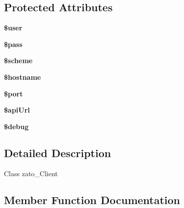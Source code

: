 \subsection*{Protected Attributes}
\begin{DoxyCompactItemize}
\item 
\hypertarget{classzato_1_1_zato_client_a674d21f5f1f85c67108fc5d32270e2e3}{}{\bfseries \$user}\label{classzato_1_1_zato_client_a674d21f5f1f85c67108fc5d32270e2e3}

\item 
\hypertarget{classzato_1_1_zato_client_a6a60705a05ead6f984e5021e6732b679}{}{\bfseries \$pass}\label{classzato_1_1_zato_client_a6a60705a05ead6f984e5021e6732b679}

\item 
\hypertarget{classzato_1_1_zato_client_a23581082511d86f7ff4bfd95a3f7ea38}{}{\bfseries \$scheme}\label{classzato_1_1_zato_client_a23581082511d86f7ff4bfd95a3f7ea38}

\item 
\hypertarget{classzato_1_1_zato_client_aa784337aedae2c6d133b47f8e39cbb4b}{}{\bfseries \$hostname}\label{classzato_1_1_zato_client_aa784337aedae2c6d133b47f8e39cbb4b}

\item 
\hypertarget{classzato_1_1_zato_client_a22970e1fe49cbb785395be8e864b62e4}{}{\bfseries \$port}\label{classzato_1_1_zato_client_a22970e1fe49cbb785395be8e864b62e4}

\item 
\hypertarget{classzato_1_1_zato_client_a69cef41eff5d4b6672b3c991ed6ce8d3}{}{\bfseries \$api\+Url}\label{classzato_1_1_zato_client_a69cef41eff5d4b6672b3c991ed6ce8d3}

\item 
\hypertarget{classzato_1_1_zato_client_a9b87cfb04bd1f2ae050d7766fba55b79}{}{\bfseries \$debug}\label{classzato_1_1_zato_client_a9b87cfb04bd1f2ae050d7766fba55b79}

\end{DoxyCompactItemize}


\subsection{Detailed Description}
Class zato\+\_\+\+Client 

\subsection{Member Function Documentation}
\hypertarget{classzato_1_1_zato_client_ab1694e645df20117a171d3555493f11b}{}
